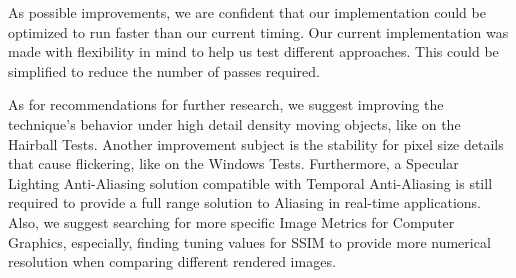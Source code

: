 \documentclass{cslthse-msc}
\begin{document}
As possible improvements, we are confident that our implementation could be optimized to run faster than our current timing. Our current implementation was made with flexibility in mind to help us test different approaches. This could be simplified to reduce the number of passes required. 

As for recommendations for further research, we suggest improving the technique's behavior under high detail density moving objects, like on the Hairball Tests. Another improvement subject is the stability for pixel size details that cause flickering, like on the Windows Tests. Furthermore, a Specular Lighting Anti-Aliasing solution compatible with Temporal Anti-Aliasing is still required to provide a full range solution to Aliasing in real-time applications. Also, we suggest searching for more specific Image Metrics for Computer Graphics, especially, finding tuning values for SSIM to provide more numerical resolution when comparing different rendered images.


\end{document}
